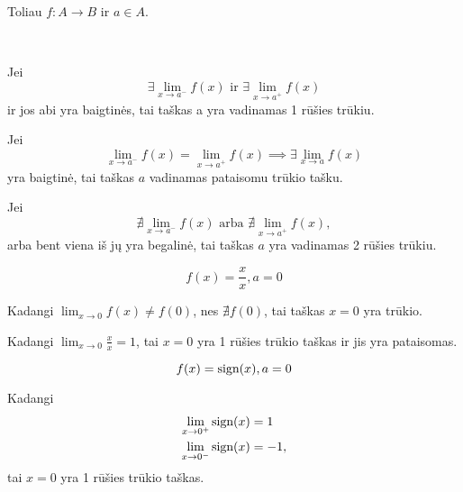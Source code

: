 \begin{note}
  Toliau $f: A \to B$ ir $a \in A$.
\end{note}

\begin{defn}
  \begin{description}
    \hfill \\
    \item[1 rūšies trūkis] Jei 
      \begin{equation*}
        \exists \lim _{x \to a^{-}} f(x) 
        \text{ ir }
        \exists \lim _{x \to a^{+}} f(x) 
      \end{equation*}
       ir jos abi yra baigtinės, tai
      taškas a yra vadinamas 1 rūšies trūkiu.
    \item[pataisomas trūkis] Jei
      \begin{equation*}
        \lim _{x \to a^{-}} f(x) = \lim _{x \to a^{+}} f(x) 
        \implies \exists \lim _{x \to a} f(x)
      \end{equation*}
      yra baigtinė, tai taškas $a$ vadinamas pataisomu trūkio tašku.
    \item[2 rūšies trūkis] Jei
      \begin{equation*}
        \nexists \lim _{x \to a^{-}} f(x)
        \text{ arba }
        \nexists \lim _{x \to a^{+}} f(x),
      \end{equation*}
      arba bent viena iš jų yra begalinė, tai taškas $a$ yra vadinamas
      2 rūšies trūkiu.
  \end{description}
\end{defn}

\begin{exmp}
  \begin{equation*}
    f(x) = \frac{x}{x}, a = 0
  \end{equation*}

  Kadangi $\lim _{x \to 0} f(x) \neq f(0)$, nes $\nexists f(0)$, tai
  taškas $x = 0$ yra trūkio.

  Kadangi $\lim _{x \to 0} \frac{x}{x} = 1$, tai $x = 0$ yra 1 rūšies
  trūkio taškas ir jis yra pataisomas.
\end{exmp}

\begin{exmp}
  \begin{equation*}
    f(x) = \mathop{\text{sign}}(x), a = 0
  \end{equation*}

  Kadangi
  \begin{align*}
    \lim _{x \to 0^{+}} \mathop{\text{sign}}(x) &= 1 \\
    \lim _{x \to 0^{-}} \mathop{\text{sign}}(x) &= -1,
  \end{align*}
  tai $x = 0$ yra 1 rūšies trūkio taškas.
\end{exmp}

